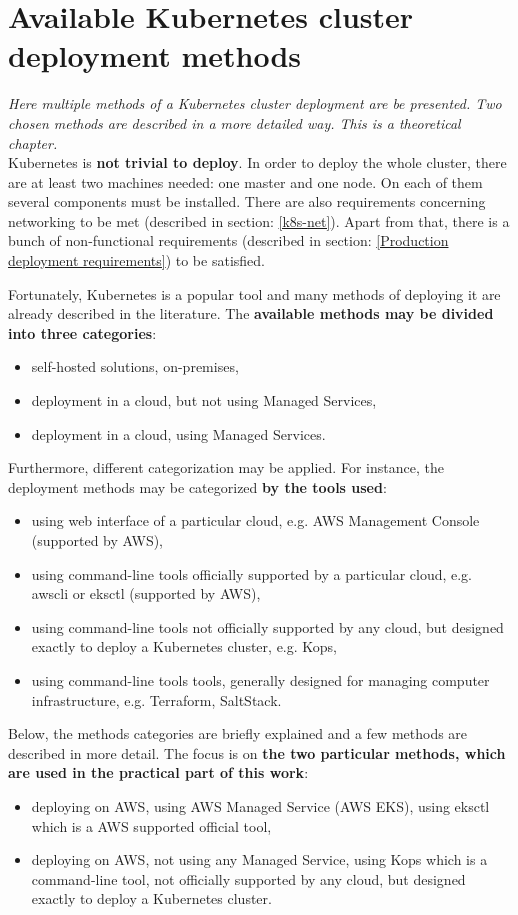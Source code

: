 \section{Available Kubernetes cluster deployment methods}
\textit{Here multiple methods of a Kubernetes cluster deployment are be presented. Two chosen methods are described in a more detailed way. This is a theoretical chapter.}
\\

Kubernetes is \textbf{not trivial to deploy}. In order to deploy the whole cluster, there are at least two machines needed: one master and one node. On each of them several components must be installed. There are also requirements concerning networking to be met (described in section: \ref{k8s-net}). Apart from that, there is a bunch of non-functional requirements (described in section: \ref{Production deployment requirements}) to be satisfied.

Fortunately, Kubernetes is a popular tool and many methods of deploying it are already described in the literature. The \textbf{available methods may be divided into three categories}:
\begin{itemize}
\item self-hosted solutions, on-premises,
\item deployment in a cloud, but not using Managed Services,
\item deployment in a cloud, using Managed Services.
\end{itemize}

Furthermore, different categorization may be applied. For instance, the deployment methods may be categorized \textbf{by the tools used}:
\begin{itemize}
\item using web interface of a particular cloud, e.g. AWS Management Console (supported by AWS),
\item using command-line tools officially supported by a particular cloud, e.g. awscli or eksctl (supported by AWS),
\item using command-line tools not officially supported by any cloud, but designed exactly to deploy a Kubernetes cluster, e.g. Kops,
\item using command-line tools tools, generally designed for managing computer infrastructure, e.g. Terraform, SaltStack.
\end{itemize}

Below, the methods categories are briefly explained and a few methods are described in more detail. The focus is on \textbf{the two particular methods, which are used in the practical part of this work}:
\begin{itemize}
\item deploying on AWS, using AWS Managed Service (AWS EKS), using eksctl which is a AWS supported official tool,
\item deploying on AWS, not using any Managed Service, using Kops which is a command-line tool, not officially supported by any cloud, but designed exactly to deploy a Kubernetes cluster.
\end{itemize}

